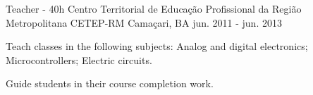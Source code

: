 \begin{cventries}
  \cventry
    {Teacher - 40h} %
    {Centro Territorial de Educação Profissional da Região Metropolitana CETEP-RM} %
    {Camaçari, BA} %
    {jun. 2011 - jun. 2013} %
    {
      \begin{cvitems} %
        \item {Teach classes in the following subjects: Analog and digital electronics; Microcontrollers; Electric circuits.}
        \item {Guide students in their course completion work.}
      \end{cvitems}
    }
    
    



\end{cventries}
